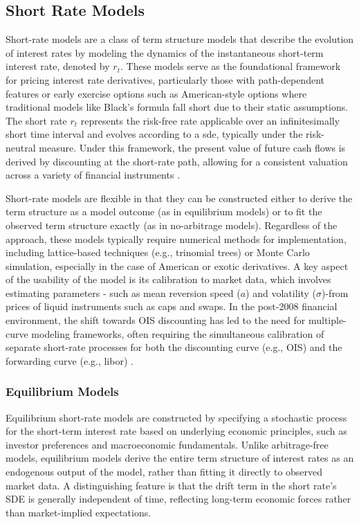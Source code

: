 \subsection{Short Rate Models} \label{short_rate_models}
Short-rate models are a class of term structure models that describe the evolution of interest rates by modeling the dynamics of the instantaneous short-term interest rate, denoted by $r_{t}$. These models serve as the foundational framework for pricing interest rate derivatives, particularly those with path-dependent features or early exercise options such as American-style options where traditional models like Black's formula fall short due to their static assumptions. The short rate $r_{t}$ represents the risk-free rate applicable over an infinitesimally short time interval and evolves according to a \ac{sde}, typically under the risk-neutral measure. Under this framework, the present value of future cash flows is derived by discounting at the short-rate path, allowing for a consistent valuation across a variety of financial instruments \parencite[pp.~706--735]{hull2015optionsfutures}.

Short-rate models are flexible in that they can be constructed either to derive the term structure as a model outcome (as in equilibrium models) or to fit the observed term structure exactly (as in no-arbitrage models). Regardless of the approach, these models typically require numerical methods for implementation, including lattice-based techniques (e.g., trinomial trees) or Monte Carlo simulation, especially in the case of American or exotic derivatives. A key aspect of the usability of the model is its calibration to market data, which involves estimating parameters - such as mean reversion speed ($a$) and volatility ($\sigma$)-from prices of liquid instruments such as caps and swaps. In the post-2008 financial environment, the shift towards OIS discounting has led to the need for multiple-curve modeling frameworks, often requiring the simultaneous calibration of separate short-rate processes for both the discounting curve (e.g., OIS) and the forwarding curve (e.g., \ac{libor}) \parencite[pp.~706--735]{hull2015optionsfutures}.

\subsubsection{Equilibrium Models} \label{equilibrium_models}
Equilibrium short-rate models are constructed by specifying a stochastic process for the short-term interest rate based on underlying economic principles, such as investor preferences and macroeconomic fundamentals. Unlike arbitrage-free models, equilibrium models derive the entire term structure of interest rates as an endogenous output of the model, rather than fitting it directly to observed market data. A distinguishing feature is that the drift term in the short rate's SDE is generally independent of time, reflecting long-term economic forces rather than market-implied expectations.

